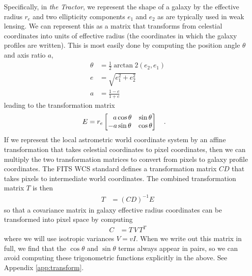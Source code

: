 \documentclass[11pt,preprint]{aastex}
\newcommand{\appref}[1]{Appendix \ref{#1}}
\newcommand{\project}[1]{\textsl{#1}}
\newcommand{\CD}{C\!D}
\begin{document}
Specifically, in \project{the Tractor}, we represent the shape of a
galaxy by the effective radius $r_e$ and two ellipticity components
$e_1$ and $e_2$ as are typically used in weak lensing.  We can
represent this as a matrix that transforms from celestial coordinates
into units of effective radius (the coordinates in which the galaxy
profiles are written).  This is most easily done by computing the
position angle $\theta$ and axis ratio $a$,
\begin{align}
%
\theta & = \frac{1}{2} \arctan\!2(e_2, e_1) \\
%
e & = \sqrt{e_1^2 + e_2^2} \\
%
a & = \frac{1 - e}{1 + e} \label{eq:a}
\end{align}
leading to the transformation matrix
\begin{align}
E &= r_e \begin{bmatrix}
\textcolor{white}{-}a \cos{\theta} & \sin{\theta} \\
-a \sin{\theta} & \cos{\theta} \\
\end{bmatrix} \quad .
\end{align}
If we represent the local astrometric world coordinate system by an
affine transformation that takes celestial coordinates to pixel
coordinates, then we can multiply the two transformation matrices to
convert from pixels to galaxy profile coordinates.  The FITS WCS
standard \citep{wcs2} defines a transformation matrix $\CD$ that takes
pixels to intermediate world coordinates.  The combined transformation
matrix $T$ is then
\begin{align}
T & = (\CD)^{-1} E
\end{align}
so that a covariance matrix in galaxy effective radius coordinates can
be transformed into pixel space by computing
\begin{align}
C &= T \, V \, T^T
\label{eq:vpix}
\end{align}
where we will use isotropic variances $V = v I$.
When we write out this matrix in full, we find that the $\cos{\theta}$
and $\sin{\theta}$ terms always appear in pairs, so we can avoid
computing these trigonometric functions explicitly in the above.  See
\appref{app:transform}.
\end{document}
